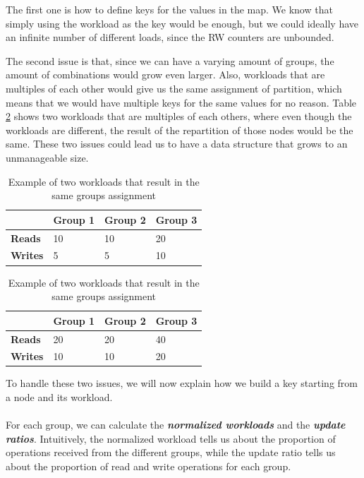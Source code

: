 The first one is how to define keys for the values in the map. We know that simply using the workload as the key would be enough, but we could ideally have an infinite number of different loads, since the RW counters are unbounded.

The second issue is that, since we can have a varying amount of groups, the amount of combinations would grow even larger. Also, workloads that are multiples of each other would give us the same assignment of partition, which means that we would have multiple keys for the same values for no reason. Table \ref{tab:lru-multiple-workload} shows two workloads that are multiples of each others, where even though the workloads are different, the result of the repartition of those nodes would be the same.
These two issues could lead us to have a data structure that grows to an unmanageable size.

\begin{table}[!htb]
  \centering
  \begin{tabular}{l l l l}
    \hline
    & \textbf{Group 1} & \textbf{Group 2} & \textbf{Group 3} \\
    \hline
    \textbf{Reads} & 10 & 10 & 20 \\
    \textbf{Writes} & 5 & 5 & 10 \\
    \hline
  \end{tabular}

  \begin{tabular}{l l l l}
    \hline
    & \textbf{Group 1} & \textbf{Group 2} & \textbf{Group 3} \\
    \hline
    \textbf{Reads} & 20 & 20 & 40 \\
    \textbf{Writes} & 10 & 10 & 20 \\

  \end{tabular}
  \caption{Example of two workloads that result in the same groups assignment}\label{tab:lru-multiple-workload}
\end{table}

To handle these two issues, we will now explain how we build a key starting from a node and its workload.
\\\\
For each group, we can calculate the \textbf{\emph{normalized workloads}} and the \textbf{\emph{update ratios}}. Intuitively, the normalized workload tells us about the proportion of operations received from the different groups, while the update ratio tells us about the proportion of read and write operations for each group.

